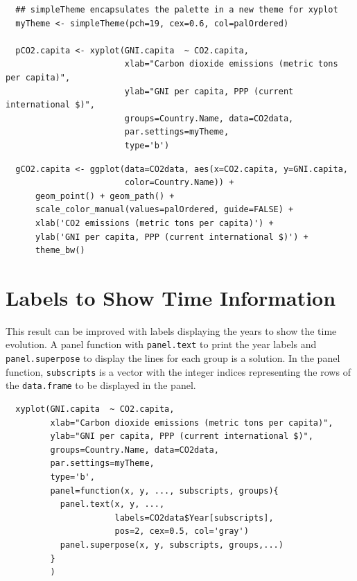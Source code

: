\documentclass[smallroyalvopaper]{memoir}
\begin{document}

\lstset{language=r,label= ,caption= ,captionpos=b,numbers=none}
\begin{lstlisting}
  ## simpleTheme encapsulates the palette in a new theme for xyplot
  myTheme <- simpleTheme(pch=19, cex=0.6, col=palOrdered)
  
  pCO2.capita <- xyplot(GNI.capita  ~ CO2.capita,
                        xlab="Carbon dioxide emissions (metric tons per capita)",
                        ylab="GNI per capita, PPP (current international $)",
                        groups=Country.Name, data=CO2data,
                        par.settings=myTheme,
                        type='b')
\end{lstlisting}

\lstset{language=r,label= ,caption= ,captionpos=b,numbers=none}
\begin{lstlisting}
  gCO2.capita <- ggplot(data=CO2data, aes(x=CO2.capita, y=GNI.capita,
                        color=Country.Name)) +
      geom_point() + geom_path() +
      scale_color_manual(values=palOrdered, guide=FALSE) +
      xlab('CO2 emissions (metric tons per capita)') +
      ylab('GNI per capita, PPP (current international $)') +
      theme_bw()
\end{lstlisting}

\section{Labels to Show Time Information}
\label{sec:orgb1d6814}
This result can be improved with labels displaying the years to show
the time evolution.  A panel function with \texttt{panel.text} to print the
year labels and \texttt{panel.superpose} to display the lines for each group
is a solution. In the panel function, \texttt{subscripts} is a vector with
the integer indices representing the rows of the \texttt{data.frame} to be
displayed in the panel.

 

\lstset{language=r,label= ,caption= ,captionpos=b,numbers=none}
\begin{lstlisting}
  xyplot(GNI.capita  ~ CO2.capita,
         xlab="Carbon dioxide emissions (metric tons per capita)",
         ylab="GNI per capita, PPP (current international $)",
         groups=Country.Name, data=CO2data,
         par.settings=myTheme,
         type='b', 
         panel=function(x, y, ..., subscripts, groups){
           panel.text(x, y, ...,
                      labels=CO2data$Year[subscripts],
                      pos=2, cex=0.5, col='gray')
           panel.superpose(x, y, subscripts, groups,...)
         }
         )
\end{lstlisting}
\end{document}
